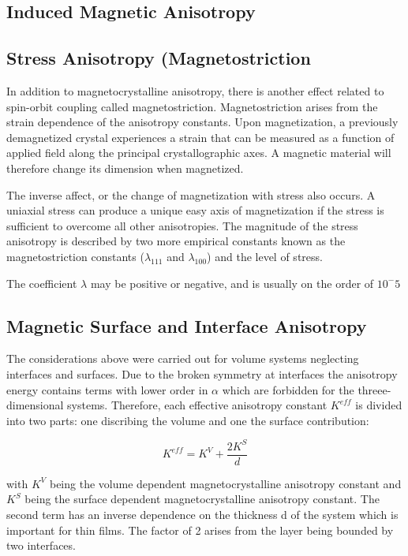 \documentclass[10pt]{article} %
\begin{document}
\subsection{Induced Magnetic Anisotropy}

\subsection{Stress Anisotropy (Magnetostriction}
In addition to magnetocrystalline anisotropy, there is another effect related to spin-orbit coupling called magnetostriction. Magnetostriction arises from the strain dependence of the anisotropy constants. Upon magnetization, a previously demagnetized crystal experiences a strain that can be measured as a function of applied field along the principal crystallographic axes. A magnetic material will therefore change its dimension when magnetized.

The inverse affect, or the change of magnetization with stress also occurs. A uniaxial stress can produce a unique easy axis of magnetization if the stress is sufficient to overcome all other anisotropies. The magnitude of the stress anisotropy is described by two more empirical constants known as the magnetostriction constants ($\lambda_{111}$ and $\lambda_{100}$) and the level of stress.

The coefficient $\lambda$ may be positive or negative, and is usually on the order of $10^-5$

\subsection{Magnetic Surface and Interface Anisotropy}
The considerations above were carried out for volume systems neglecting interfaces and surfaces. Due to the broken symmetry at interfaces the anisotropy energy contains terms with lower order in $\alpha$ which are forbidden for the threee-dimensional systems. Therefore, each effective anisotropy constant $K^{eff}$ is divided into two parts: one discribing the volume and one the surface contribution:

\begin{equation}
K^{eff} = K^V + \frac{2K^S}{d}
\end{equation}

with $K^V$ being the volume dependent magnetocrystalline anisotropy constant and $K^S$ being the surface dependent magnetocrystalline anisotropy constant. The second term has an inverse dependence on the thickness d of the system which is important for thin films. The factor of 2 arises from the layer being bounded by two interfaces.
\end{document}
